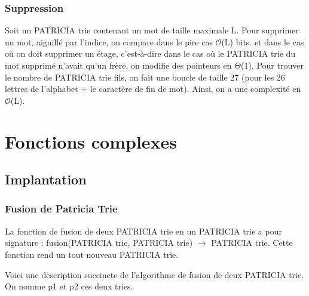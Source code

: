 \documentclass[a4paper,12pt]{report}
\begin{document}
\subsection{Suppression}
Soit un PATRICIA trie contenant un mot de taille maximale L. Pour supprimer un mot, aiguillé par l'indice, on compare dans le pire cas $\mathcal{O}$(L) bits. et dans le cas où on doit supprimer un étage, c'est-à-dire dans le cas où le PATRICIA trie du mot supprimé n'avait qu'un frère, on modifie des pointeurs en $\Theta$(1). Pour trouver le nombre de PATRICIA trie fils, on fait une boucle de taille 27 (pour les 26 lettres de l'alphabet + le caractère de fin de mot). Ainsi, on a une complexité en  $\mathcal{O}$(L).


\chapter{Fonctions complexes}
\section{Implantation}
\subsection{Fusion de Patricia Trie}

La fonction de fusion de deux PATRICIA trie en un PATRICIA trie a pour signature : fusion(PATRICIA trie, PATRICIA trie) $\rightarrow$ PATRICIA trie.
Cette fonction rend un tout nouveau PATRICIA trie.

Voici une description succincte de l'algorithme de fusion de deux PATRICIA trie.
On nomme p1 et p2 ces deux tries.
\end{document}
